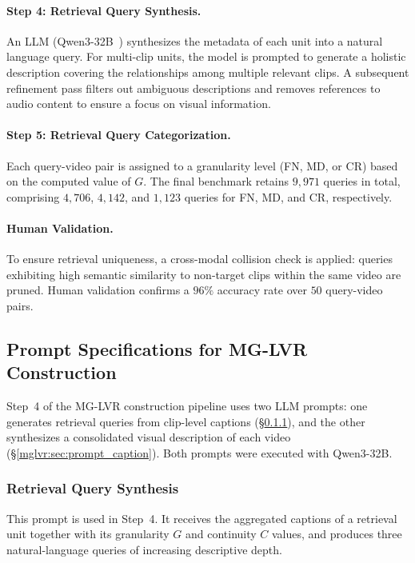 \paragraph{Step 4: Retrieval Query Synthesis.}
An LLM (Qwen3-32B~\cite{yang2025qwen3}) synthesizes the metadata of each unit into a natural language query. For multi-clip units, the model is prompted to generate a holistic description covering the relationships among multiple relevant clips. A subsequent refinement pass filters out ambiguous descriptions and removes references to audio content to ensure a focus on visual information.

\paragraph{Step 5: Retrieval Query Categorization.}
Each query-video pair is assigned to a granularity level (FN, MD, or CR) based on the computed value of $G$. The final benchmark retains $9,971$ queries in total, comprising $4,706$, $4,142$, and $1,123$ queries for FN, MD, and CR, respectively.

\paragraph{Human Validation.}
To ensure retrieval uniqueness, a cross-modal collision check is applied: queries exhibiting high semantic similarity to non-target clips within the same video are pruned. Human validation confirms a $96\%$ accuracy rate over $50$ query-video pairs.


\subsection{Prompt Specifications for MG-LVR Construction}
\label{mglvr:sec:prompt_specs}

Step~4 of the MG-LVR construction pipeline uses two LLM prompts: one generates retrieval queries from clip-level captions (\S\ref{mglvr:sec:prompt_query}), and the other synthesizes a consolidated visual description of each video (\S\ref{mglvr:sec:prompt_caption}). Both prompts were executed with Qwen3-32B.

\subsubsection{Retrieval Query Synthesis}
\label{mglvr:sec:prompt_query}

This prompt is used in Step~4. It receives the aggregated captions of a retrieval unit together with its granularity $G$ and continuity $C$ values, and produces three natural-language queries of increasing descriptive depth.

